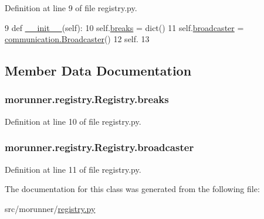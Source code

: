 Definition at line 9 of file registry.\+py.


\begin{DoxyCode}
9     \textcolor{keyword}{def }\hyperlink{classmorunner_1_1registry_1_1Registry_a642af4ac15c0399e28377ca8bebeefef}{\_\_init\_\_}(self):
10         self.\hyperlink{classmorunner_1_1registry_1_1Registry_a81f0b9c25ffd437f3b93d87e28211a6f}{breaks} = dict()
11         self.\hyperlink{classmorunner_1_1registry_1_1Registry_a526c4dd0693ed9206da10968a73f1ec6}{broadcaster} = \hyperlink{classmorunner_1_1communication_1_1Broadcaster}{communication.Broadcaster}()
12         self.
13 \end{DoxyCode}


\subsection{Member Data Documentation}
\hypertarget{classmorunner_1_1registry_1_1Registry_a81f0b9c25ffd437f3b93d87e28211a6f}{}
\subsubsection[{breaks}]{\setlength{\rightskip}{0pt plus 5cm}morunner.\+registry.\+Registry.\+breaks}\label{classmorunner_1_1registry_1_1Registry_a81f0b9c25ffd437f3b93d87e28211a6f}


Definition at line 10 of file registry.\+py.

\hypertarget{classmorunner_1_1registry_1_1Registry_a526c4dd0693ed9206da10968a73f1ec6}{}
\subsubsection[{broadcaster}]{\setlength{\rightskip}{0pt plus 5cm}morunner.\+registry.\+Registry.\+broadcaster}\label{classmorunner_1_1registry_1_1Registry_a526c4dd0693ed9206da10968a73f1ec6}


Definition at line 11 of file registry.\+py.



The documentation for this class was generated from the following file\+:\begin{DoxyCompactItemize}
\item 
src/morunner/\hyperlink{registry_8py}{registry.\+py}\end{DoxyCompactItemize}
